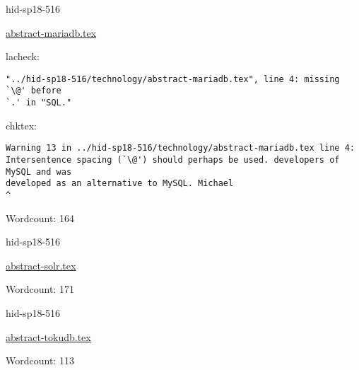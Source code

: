 

\begin{IU}

hid-sp18-516

\href{https://github.com/cloudmesh-community/hid-sp18-516/blob/master//technology/abstract-mariadb.tex}{abstract-mariadb.tex}

 
lacheck:
\begin{tiny}
\begin{verbatim}
"../hid-sp18-516/technology/abstract-mariadb.tex", line 4: missing `\@' before
`.' in "SQL."
\end{verbatim}
\end{tiny}
chktex:
\begin{tiny}
\begin{verbatim}
Warning 13 in ../hid-sp18-516/technology/abstract-mariadb.tex line 4:
Intersentence spacing (`\@') should perhaps be used. developers of MySQL and was
developed as an alternative to MySQL. Michael
^
\end{verbatim}
\end{tiny}

Wordcount: 164

\end{IU}



\begin{IU}

hid-sp18-516

\href{https://github.com/cloudmesh-community/hid-sp18-516/blob/master//technology/abstract-solr.tex}{abstract-solr.tex}

 

Wordcount: 171

\end{IU}



\begin{IU}

hid-sp18-516

\href{https://github.com/cloudmesh-community/hid-sp18-516/blob/master//technology/abstract-tokudb.tex}{abstract-tokudb.tex}

 

Wordcount: 113

\end{IU}



